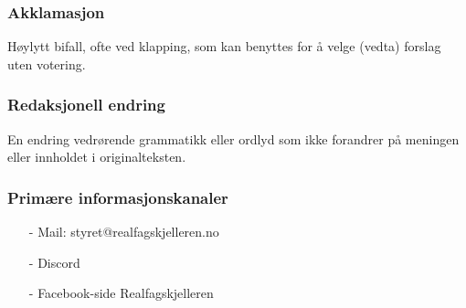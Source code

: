 \subsubsection*{Akklamasjon}
Høylytt bifall, ofte ved klapping, som kan benyttes for å velge (vedta) forslag uten votering.

\subsubsection*{Redaksjonell endring}
En endring vedrørende grammatikk eller ordlyd som ikke forandrer på meningen eller innholdet i originalteksten.

\subsubsection*{Primære informasjonskanaler}
\begin{itemize}
    \item[-] Mail: styret@realfagskjelleren.no
    \item[-] Discord
    \item[-] Facebook-side Realfagskjelleren
\end{itemize}